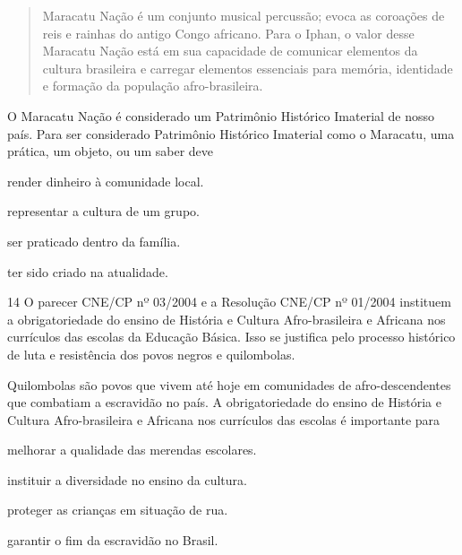\begin{quote}
Maracatu Nação é um conjunto musical percussão; evoca as coroações de reis e rainhas do antigo Congo africano.
Para o Iphan, o valor desse Maracatu Nação está em sua
capacidade de comunicar elementos da cultura brasileira e carregar
elementos essenciais para memória, identidade e formação da
população afro-brasileira.

\end{quote}

\noindent{}O Maracatu Nação é considerado um Patrimônio Histórico Imaterial de
nosso país. Para ser considerado Patrimônio Histórico Imaterial como o
Maracatu, uma prática, um objeto, ou um saber deve

\begin{minipage}{0.5\textwidth}
\begin{escolha}
\item render dinheiro à comunidade local.

\item representar a cultura de um grupo.

\item ser praticado dentro da família.

\item ter sido criado na atualidade.
\end{escolha}
\end{minipage}

\pagebreak
\num{14} O parecer CNE/CP nº 03/2004 e a Resolução CNE/CP nº 01/2004 instituem a
obrigatoriedade do ensino de História e Cultura Afro-brasileira e
Africana nos currículos das escolas da Educação
Básica. Isso se justifica pelo processo histórico de luta e
resistência dos povos negros e quilombolas.


\noindent{}Quilombolas são povos que vivem até hoje em comunidades de
afro-descendentes que combatiam a escravidão no país. A
obrigatoriedade do ensino de História e Cultura Afro-brasileira e
Africana nos currículos das escolas é importante para

\begin{escolha}
\item melhorar a qualidade das merendas escolares.

\item instituir a diversidade no ensino da cultura.

\item proteger as crianças em situação de rua.

\item garantir o fim da escravidão no Brasil.
\end{escolha}

